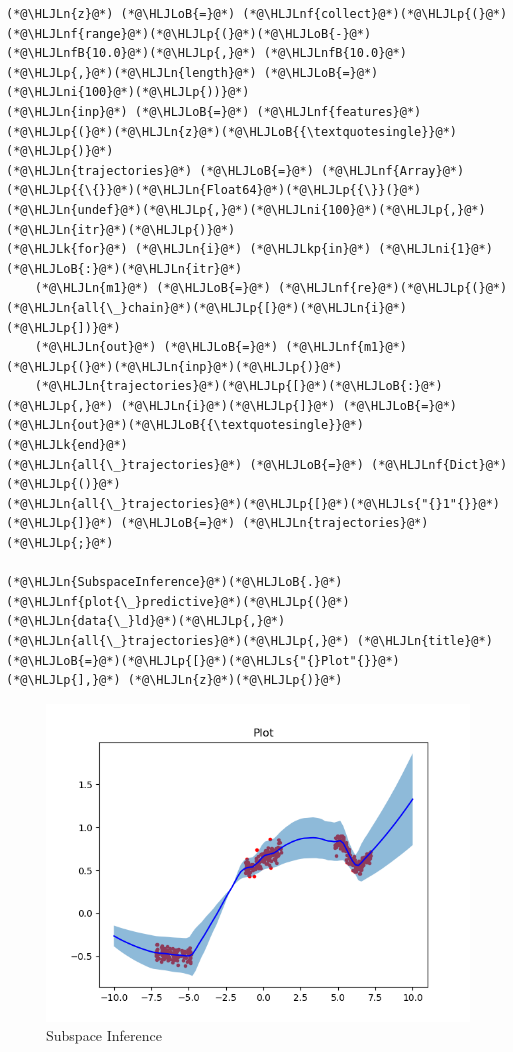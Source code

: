 \documentclass[12pt,a4paper]{article}
\newcommand{\HLJLk}[1]{\textcolor[RGB]{148,91,176}{\textbf{#1}}}
\newcommand{\HLJLkp}[1]{\textcolor[RGB]{148,91,176}{\textbf{#1}}}
\newcommand{\HLJLn}[1]{#1}
\newcommand{\HLJLnf}[1]{\textcolor[RGB]{66,102,213}{#1}}
\newcommand{\HLJLs}[1]{\textcolor[RGB]{201,61,57}{#1}}
\newcommand{\HLJLnfB}[1]{\textcolor[RGB]{59,151,46}{#1}}
\newcommand{\HLJLni}[1]{\textcolor[RGB]{59,151,46}{#1}}
\newcommand{\HLJLoB}[1]{\textcolor[RGB]{102,102,102}{\textbf{#1}}}
\newcommand{\HLJLp}[1]{#1}
\begin{document}
\begin{lstlisting}
(*@\HLJLn{z}@*) (*@\HLJLoB{=}@*) (*@\HLJLnf{collect}@*)(*@\HLJLp{(}@*)(*@\HLJLnf{range}@*)(*@\HLJLp{(}@*)(*@\HLJLoB{-}@*)(*@\HLJLnfB{10.0}@*)(*@\HLJLp{,}@*) (*@\HLJLnfB{10.0}@*)(*@\HLJLp{,}@*)(*@\HLJLn{length}@*) (*@\HLJLoB{=}@*) (*@\HLJLni{100}@*)(*@\HLJLp{))}@*)
(*@\HLJLn{inp}@*) (*@\HLJLoB{=}@*) (*@\HLJLnf{features}@*)(*@\HLJLp{(}@*)(*@\HLJLn{z}@*)(*@\HLJLoB{{\textquotesingle}}@*)(*@\HLJLp{)}@*)
(*@\HLJLn{trajectories}@*) (*@\HLJLoB{=}@*) (*@\HLJLnf{Array}@*)(*@\HLJLp{{\{}}@*)(*@\HLJLn{Float64}@*)(*@\HLJLp{{\}}(}@*)(*@\HLJLn{undef}@*)(*@\HLJLp{,}@*)(*@\HLJLni{100}@*)(*@\HLJLp{,}@*)(*@\HLJLn{itr}@*)(*@\HLJLp{)}@*)
(*@\HLJLk{for}@*) (*@\HLJLn{i}@*) (*@\HLJLkp{in}@*) (*@\HLJLni{1}@*)(*@\HLJLoB{:}@*)(*@\HLJLn{itr}@*)
	(*@\HLJLn{m1}@*) (*@\HLJLoB{=}@*) (*@\HLJLnf{re}@*)(*@\HLJLp{(}@*)(*@\HLJLn{all{\_}chain}@*)(*@\HLJLp{[}@*)(*@\HLJLn{i}@*)(*@\HLJLp{])}@*)
	(*@\HLJLn{out}@*) (*@\HLJLoB{=}@*) (*@\HLJLnf{m1}@*)(*@\HLJLp{(}@*)(*@\HLJLn{inp}@*)(*@\HLJLp{)}@*)
	(*@\HLJLn{trajectories}@*)(*@\HLJLp{[}@*)(*@\HLJLoB{:}@*)(*@\HLJLp{,}@*) (*@\HLJLn{i}@*)(*@\HLJLp{]}@*) (*@\HLJLoB{=}@*) (*@\HLJLn{out}@*)(*@\HLJLoB{{\textquotesingle}}@*)
(*@\HLJLk{end}@*)
(*@\HLJLn{all{\_}trajectories}@*) (*@\HLJLoB{=}@*) (*@\HLJLnf{Dict}@*)(*@\HLJLp{()}@*)
(*@\HLJLn{all{\_}trajectories}@*)(*@\HLJLp{[}@*)(*@\HLJLs{"{}1"{}}@*)(*@\HLJLp{]}@*) (*@\HLJLoB{=}@*) (*@\HLJLn{trajectories}@*)(*@\HLJLp{;}@*)

(*@\HLJLn{SubspaceInference}@*)(*@\HLJLoB{.}@*)(*@\HLJLnf{plot{\_}predictive}@*)(*@\HLJLp{(}@*)(*@\HLJLn{data{\_}ld}@*)(*@\HLJLp{,}@*) (*@\HLJLn{all{\_}trajectories}@*)(*@\HLJLp{,}@*) (*@\HLJLn{title}@*)(*@\HLJLoB{=}@*)(*@\HLJLp{[}@*)(*@\HLJLs{"{}Plot"{}}@*)(*@\HLJLp{],}@*) (*@\HLJLn{z}@*)(*@\HLJLp{)}@*)
\end{lstlisting}

\begin{figure}
\centering
\includegraphics{img/sub_inference.png}
\caption{Subspace Inference}
\end{figure}
\end{document}
